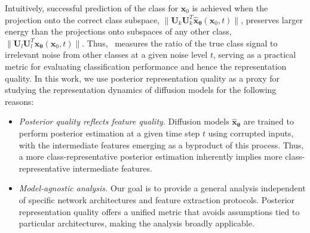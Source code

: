 Intuitively, successful prediction of the class for $\bm x_0$ is achieved when the projection onto the correct class subspace, $\|\bm U_k\bm U_k^T \hat{\bm x}_{\bm \theta}(\bm x_0, t)\|$, preserves larger energy than the projections onto subspaces of any other class, $\|\bm U_l\bm U_l^T \hat{\bm x}_{\bm \theta}(\bm x_0, t)\|$. Thus, \CSNR~measures the ratio of the true class signal to irrelevant noise from other classes at a given noise level $t$, serving as a practical metric for evaluating classification performance and hence the representation quality. In this work, we use posterior representation quality as a proxy for studying the representation dynamics of diffusion models for the following reasons:
\begin{itemize}[leftmargin=*]
    \item \emph{Posterior quality reflects feature quality.} Diffusion models $\hat{\bm{x}}_{\bm{\theta}}$ are trained to perform posterior estimation at a given time step $t$ using corrupted inputs, with the intermediate features emerging as a byproduct of this process. Thus, a more class-representative posterior estimation inherently implies more class-representative intermediate features.
    \item \emph{Model-agnostic analysis.} Our goal is to provide a general analysis independent of specific network architectures and feature extraction protocols. Posterior representation quality offers a unified metric that avoids assumptions tied to particular architectures, making the analysis broadly applicable.
\end{itemize}


